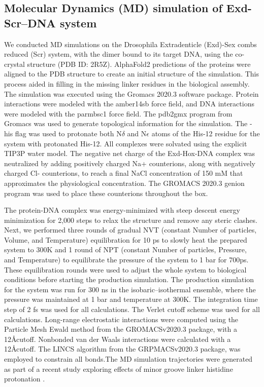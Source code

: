 \subsection{Molecular Dynamics (MD) simulation of Exd-Scr–DNA system}
We conducted MD simulations on the Drosophila Extradenticle (Exd)-Sex combs reduced (Scr) system, with the dimer bound to its target DNA, using the co-crystal structure (PDB ID: 2R5Z). AlphaFold2 predictions of the proteins were aligned to the PDB structure to create an initial structure of the simulation. This process aided in filling in the missing linker residues in the biological assembly. The simulation was executed using the Gromacs \citep{Abraham2015} 2020.3 software package. Protein interactions were modeled with the amber14sb \citep{Maier2015} force field, and DNA interactions were modeled with the parmbsc1 \citep{Ivani2016} force field. The pdb2gmx program from Gromacs was used to generate topological information for the simulation. The -his flag was used to protonate both N$\delta$ and N$\epsilon$ atoms of the His-12 residue for the system with protonated His-12. All complexes were solvated using the explicit TIP3P water model. The negative net charge of the Exd-Hox-DNA complex was neutralized by adding positively charged Na+ counterions, along with negatively charged Cl- counterions, to reach a final NaCl concentration of 150 mM that approximates the physiological concentration. The GROMACS 2020.3 genion program was used to place these counterions throughout the box. 
\par
The protein-DNA complex was energy-minimized with steep descent energy minimization for 2,000 steps to relax the structure and remove any steric clashes. Next, we performed three rounds of gradual NVT (constant Number of particles, Volume, and Temperature) equilibration for 10 ps to slowly heat the prepared system to 300K and 1 round of NPT (constant Number of particles, Pressure, and Temperature) to equilibrate the pressure of the system to 1 bar for 700ps. These equilibration rounds were used to adjust the whole system to biological conditions before starting the production simulation. The production simulation for the system was run for 300 ns in the isobaric–isothermal ensemble, where the pressure was maintained at 1 bar and temperature at 300K. The integration time step of 2 fs was used for all calculations. The Verlet cutoff scheme was used for all calculations. Long-range electrostatic interactions were computed using the Particle Mesh Ewald method \citep{Darden1993} from the GROMACSv2020.3 package, with a 12\AA cutoff. Nonbonded van der Waals interactions were calculated with a 12\AA cutoff. The LINCS \citep{Hess1997} algorithm from the GRPMACSv2020.3 package, was employed to constrain all bonds.The MD simulation trajectories were generated as part of a recent study exploring effects of minor groove linker histidine protonation \citep{Jiang2023}.
\\
